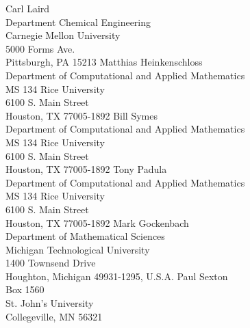 \documentclass[pdf,ps2pdf,11pt]{SANDreport}
\begin{document}
\begin{SANDdistribution}
 Carl Laird \\ Department Chemical Engineering\\Carnegie Mellon University\\5000 Forms Ave.\\Pittsburgh, PA 15213
 Matthias Heinkenschloss \\ Department of Computational and Applied Mathematics\\MS 134 Rice University\\
6100 S. Main Street\\Houston, TX 77005-1892
 Bill Symes\\Department of Computational and Applied Mathematics\\MS 134 Rice University\\
6100 S. Main Street\\Houston, TX 77005-1892
 Tony Padula\\Department of Computational and Applied Mathematics\\MS 134 Rice University\\
6100 S. Main Street\\Houston, TX 77005-1892
 Mark Gockenbach \\ Department of Mathematical Sciences\\Michigan Technological University\\ 
1400 Townsend Drive\\Houghton, Michigan 49931-1295, U.S.A.
 Paul Sexton \\ Box 1560 \\ St. John's University \\ Collegeville, MN 56321

\end{SANDdistribution}
\end{document}
